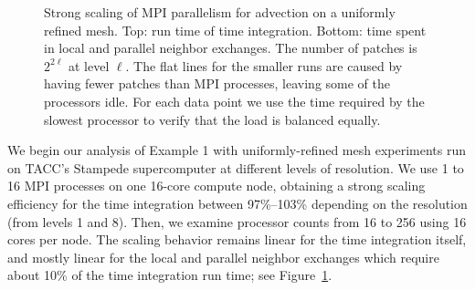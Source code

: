 \documentclass{IOS-Book-Article}     %
\newcommand{\comment}[1]{\textcolor{green}{[DAC: #1]}\xspace}
\newcommand{\Fig}[1]{Figure~\ref{fig:#1}}
\begin{document}
\begin{figure}
\begin{center}
\end{center}
\caption{Strong scaling of MPI parallelism for advection on a
  uniformly refined mesh.  Top: run time of time integration.  Bottom:
  time spent in local and parallel neighbor exchanges.  The number of
  patches is $2^{2 \ell}$ at level $\ell$.  The flat lines for the
  smaller runs are caused by having fewer patches than MPI processes,
  leaving some of the processors idle.  For each data point we use the
  time required by the slowest processor to verify that the load is
  balanced equally.
}
\label{fig:uniscale}
\end{figure}%
We begin our analysis of Example 1 with uniformly-refined mesh experiments run on TACC's
Stampede supercomputer at different levels of resolution.
We use 1 to 16 MPI processes on one 16-core compute node, obtaining a strong
scaling efficiency for the time integration between 97\%--103\% depending on
the resolution (from levels 1 and 8).  Then, we examine processor counts from
16 to 256 using 16 cores per node.  The scaling behavior remains linear for
the time integration itself, and mostly linear for the local and parallel
neighbor exchanges which require about 10\% of the time integration run time;
see \Fig{uniscale}.
\end{document}
